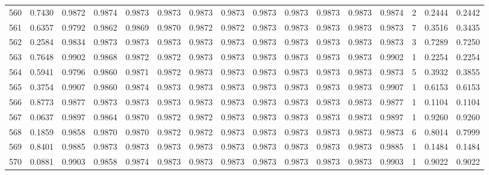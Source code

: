 \begin{tabular}{lrrrrrrrrrrrrrrr}
560 &      0.7430 &  0.9872 &  0.9874 &  0.9873 &  0.9873 &  0.9873 &  0.9873 &  0.9873 &  0.9873 &  0.9873 &   0.9873 &     0.9874 &      2 &                    0.2444 &                     0.2442 \\
561 &      0.6357 &  0.9792 &  0.9862 &  0.9869 &  0.9870 &  0.9872 &  0.9872 &  0.9873 &  0.9873 &  0.9873 &   0.9873 &     0.9873 &      7 &                    0.3516 &                     0.3435 \\
562 &      0.2584 &  0.9834 &  0.9873 &  0.9873 &  0.9873 &  0.9873 &  0.9873 &  0.9873 &  0.9873 &  0.9873 &   0.9873 &     0.9873 &      3 &                    0.7289 &                     0.7250 \\
563 &      0.7648 &  0.9902 &  0.9868 &  0.9872 &  0.9872 &  0.9873 &  0.9873 &  0.9873 &  0.9873 &  0.9873 &   0.9873 &     0.9902 &      1 &                    0.2254 &                     0.2254 \\
564 &      0.5941 &  0.9796 &  0.9860 &  0.9871 &  0.9872 &  0.9873 &  0.9873 &  0.9873 &  0.9873 &  0.9873 &   0.9873 &     0.9873 &      5 &                    0.3932 &                     0.3855 \\
565 &      0.3754 &  0.9907 &  0.9860 &  0.9874 &  0.9873 &  0.9873 &  0.9873 &  0.9873 &  0.9873 &  0.9873 &   0.9873 &     0.9907 &      1 &                    0.6153 &                     0.6153 \\
566 &      0.8773 &  0.9877 &  0.9873 &  0.9873 &  0.9873 &  0.9873 &  0.9873 &  0.9873 &  0.9873 &  0.9873 &   0.9873 &     0.9877 &      1 &                    0.1104 &                     0.1104 \\
567 &      0.0637 &  0.9897 &  0.9864 &  0.9870 &  0.9872 &  0.9872 &  0.9873 &  0.9873 &  0.9873 &  0.9873 &   0.9873 &     0.9897 &      1 &                    0.9260 &                     0.9260 \\
568 &      0.1859 &  0.9858 &  0.9870 &  0.9870 &  0.9872 &  0.9872 &  0.9873 &  0.9873 &  0.9873 &  0.9873 &   0.9873 &     0.9873 &      6 &                    0.8014 &                     0.7999 \\
569 &      0.8401 &  0.9885 &  0.9873 &  0.9873 &  0.9873 &  0.9873 &  0.9873 &  0.9873 &  0.9873 &  0.9873 &   0.9873 &     0.9885 &      1 &                    0.1484 &                     0.1484 \\
570 &      0.0881 &  0.9903 &  0.9858 &  0.9874 &  0.9873 &  0.9873 &  0.9873 &  0.9873 &  0.9873 &  0.9873 &   0.9873 &     0.9903 &      1 &                    0.9022 &                     0.9022 \\

\end{tabular}
